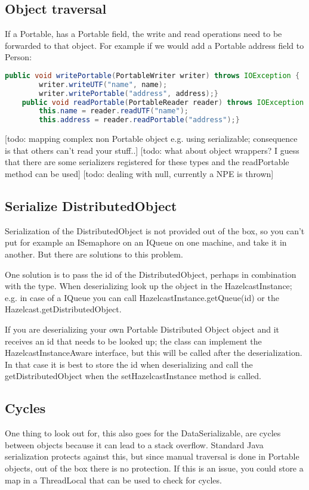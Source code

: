 \subsection*{Object traversal}
If a Portable, has a Portable field, the write and read operations need to be forwarded to that object. For example if we would add a Portable address field to Person:
\begin{lstlisting}[language=java]
    public void writePortable(PortableWriter writer) throws IOException {
        writer.writeUTF("name", name);
        writer.writePortable("address", address);}
    public void readPortable(PortableReader reader) throws IOException {
        this.name = reader.readUTF("name");
        this.address = reader.readPortable("address");}
\end{lstlisting}
[todo: mapping complex non Portable object e.g. using serializable; consequence is that others can't read your stuff..]
[todo: what about object wrappers? I guess that there are some serializers registered for these types and the readPortable method can be used]
[todo: dealing with null, currently a NPE is thrown]

\subsection*{Serialize DistributedObject}
Serialization of the DistributedObject is not provided out of the box, so you can't put for example an ISemaphore on an IQueue on one machine, and take it in another. But there are solutions to this problem.

One solution is to pass the id of the DistributedObject, perhaps in combination with the type. When deserializing look up the object in the HazelcastInstance; e.g. in case of a IQueue you can call HazelcastInstance.getQueue(id) or the Hazelcast.getDistributedObject.

If you are deserializing your own Portable Distributed Object object and it receives an id that needs to be looked up; the class can implement the HazelcastInstanceAware interface, but this will be called after the deserialization. In that case it is best to store the id when deserializing and call the getDistributedObject when the setHazelcastInstance method is called.

\subsection*{Cycles}
One thing to look out for, this also goes for the DataSerializable, are cycles between objects because it can lead to a stack overflow. Standard Java serialization protects against this, but since manual traversal is done in Portable objects, out of the box there is no protection. If this is an issue, you could store a map in a ThreadLocal that can be used to check for cycles.

